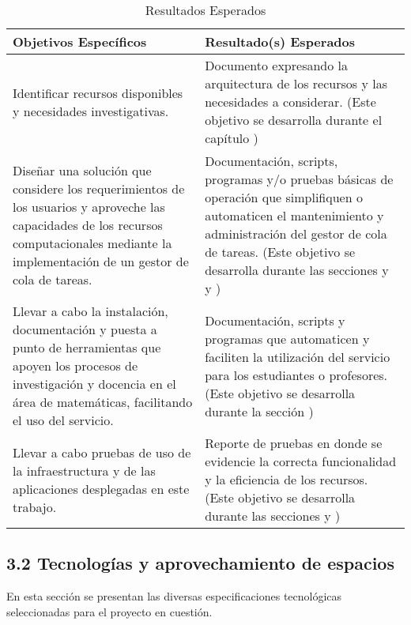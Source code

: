 \begin{spacing}{1.5}
  \begin{table}[h]
    \centering
    \begin{tabular}{p{7cm}|p{7cm}}
      \hline
      \textbf{Objetivos Específicos}                                 & \textbf{Resultado(s) Esperados}                                                                 \\
      \hline
      Identificar recursos disponibles y necesidades investigativas. &
      Documento expresando la arquitectura de los recursos y las necesidades a
      considerar. (Este objetivo se desarrolla durante el capítulo \nameref{chap:recursos-necesidades})                                                                \\
      \hline
      Diseñar una solución que considere los requerimientos de los usuarios y
      aproveche las capacidades de los recursos computacionales mediante la
      implementación de un gestor de cola de tareas.                 & Documentación, scripts,
      programas y/o pruebas básicas de operación que simplifiquen o automaticen el
      mantenimiento y administración del gestor de cola de tareas.       (Este objetivo se desarrolla durante las secciones \nameref{chap:3.2} y y \nameref{chap:4.4}) \\
      \hline
      Llevar a cabo la instalación, documentación y puesta a punto de
      herramientas que apoyen los procesos de investigación y docencia en el área de
      matemáticas, facilitando el uso del servicio.                  & Documentación, scripts y
      programas que automaticen y faciliten la utilización del servicio para los
      estudiantes o profesores. (Este objetivo se desarrolla durante la sección \nameref{chap:4.1})                                                                    \\
      \hline
      Llevar a cabo pruebas de uso de la infraestructura y de las
      aplicaciones desplegadas en este trabajo.                      & Reporte de pruebas en donde se
      evidencie la correcta funcionalidad y la eficiencia de los recursos. (Este objetivo se desarrolla durante las secciones \nameref{chap:4.2} y \nameref{chap:4.3}) \\
      \hline
    \end{tabular}
    \caption{Resultados Esperados}
    \label{table:table2}
  \end{table}

  \subsection{3.2 Tecnologías y aprovechamiento de espacios}
  \label{chap:3.2}
  En esta sección se presentan las diversas especificaciones tecnológicas
  seleccionadas para el proyecto en cuestión.


\end{spacing}
